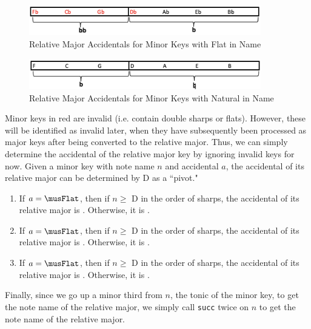 \documentclass{report}
\begin{document}
\begin{figure}[h!]
\centering
\includegraphics[width=0.9\textwidth]{images/flat_min_to_maj}
\caption{Relative Major Accidentals for Minor Keys with Flat in Name}
\label{major_flat}
\end{figure}

\begin{figure}[h!]
\centering
\includegraphics[width=0.9\textwidth]{images/natural_min_to_maj}
\caption{Relative Major Accidentals for Minor Keys with Natural in Name}
\label{major_flat}
\end{figure}

Minor keys in red are invalid (i.e. contain double sharps or flats). However, these will be identified as invalid later, when they have subsequently been processed as major keys after being converted to the relative major. Thus, we can simply determine the accidental of the relative major key by ignoring invalid keys for now. Given a minor key with note name $n$ and accidental $a$, the accidental of its relative major can be determined by D as a ``pivot." 

\begin{enumerate}
\item If $a=\musFlat$, then if $n \geq$ D in the order of sharps, the accidental of its relative major is \musSharp. Otherwise, it is \musNatural.
\item If $a=\musFlat$, then if $n \geq$ D in the order of sharps, the accidental of its relative major is \musFlat. Otherwise, it is \musDoubleFlat.
\item If $a=\musFlat$, then if $n \geq$ D in the order of sharps, the accidental of its relative major is \musNatural. Otherwise, it is \musFlat.
\end{enumerate}

Finally, since we go up a minor third from $n$, the tonic of the minor key, to get  the note name of the relative major, we simply call \verb.succ. twice on $n$ to get the note name of the relative major.

\end{document}
